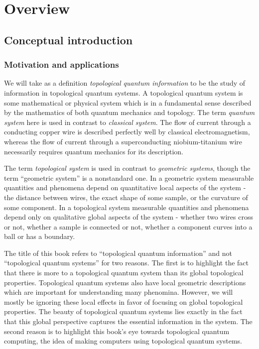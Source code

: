 \section{Overview}
\label{overview}

\subsection{Conceptual introduction}
\label{conceptual introduction}

\subsubsection{Motivation and applications}

We will take as a definition \textit{topological quantum information} to be the study of information in topological quantum systems. A topological quantum system is some mathematical or physical system which is in a fundamental sense described by the mathematics of both quantum mechanics and topology. The term \textit{quantum system} here is used in contrast to \textit{classical system}. The flow of current through a conducting copper wire is described perfectly well by classical electromagnetism, whereas the flow of current through a superconducting niobium-titanium wire necessarily requires quantum mechanics for its description.

The term \textit{topological system} is used in contrast to \textit{geometric systems}, though the term “geometric system” is a nonstandard one. In a geometric system measurable quantities and phenomena depend on quantitative local aspects of the system - the distance between wires, the exact shape of some sample, or the curvature of some component. In a topological system measurable quantities and phenomena depend only on qualitative global aspects of the system - whether two wires cross or not, whether a sample is connected or not, whether a component curves into a ball or has a boundary.

The title of this book refers to “topological quantum information” and not “topological quantum systems” for two reasons. The first is to highlight the fact that there is more to a topological quantum system than its global topological properties. Topological quantum systems also have local geometric descriptions which are important for understanding many phenomina. However, we will mostly be ignoring these local effects in favor of focusing on global topological properties. The beauty of topological quantum systems lies exactly in the fact that this global perspective captures the essential information in the system. The second reason is to highlight this book’s eye towards topological quantum computing, the idea of making computers using topological quantum systems. 

